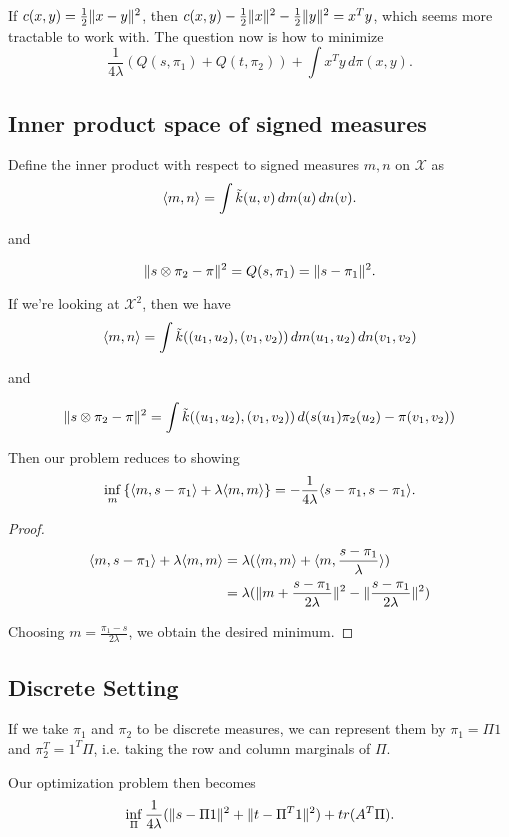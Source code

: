 If $c(x,y)=\frac{1}{2}\lVert x-y\rVert^2$, then $c(x,y)-\frac{1}{2}\lVert x\rVert^2 - \frac{1}{2}\lVert y\rVert^2 = x^{T}y$, which seems more tractable to work with. The question now is how to minimize 
$$
\frac{1}{4\lambda} (Q(s,\pi_1)+Q(t,\pi_2)) + \int x^{T}y\,d\pi(x,y).
$$

\subsection{Inner product space of signed measures}
Define the inner product with respect to signed measures $m,n$ on $\mathcal{X}$ as $$\langle m,n\rangle = \int \tilde{k}(u,v)\,dm(u)\,dn(v).$$

and

$$\lVert s\otimes \pi_2 - \pi\rVert^2 = Q(s,\pi_1) = \lVert s-\pi_1\rVert^2.$$

If we're looking at $\mathcal{X}^2$, then we have
$$
\langle m,n\rangle = \int \tilde{k}((u_1,u_2),(v_1,v_2))\,dm(u_1,u_2)\,dn(v_1,v_2)
$$

and

$$\lVert s\otimes \pi_2 - \pi\rVert^2 = \int \tilde{k}((u_1,u_2),(v_1,v_2))\,d(s(u_1)\pi_2(u_2)-\pi(v_1,v_2))$$

Then our problem reduces to showing $$\inf_m \left\lbrace \langle m,s-\pi_1\rangle + \lambda \langle m,m\rangle\right\rbrace  = -\frac{1}{4\lambda} \langle s-\pi_1,s-\pi_1\rangle.$$

\begin{proof}
	\begin{align*}
	\langle m,s-\pi_1\rangle + \lambda\langle m,m\rangle &= \lambda(\langle m,m\rangle+\langle m,\frac{s-\pi_1}{\lambda}\rangle) \\
	&= \lambda (\lVert m + \frac{s-\pi_1}{2\lambda}\rVert^2 - \lVert\frac{s-\pi_1}{2\lambda}\rVert^2)
	\end{align*}
	
	Choosing $m = \frac{\pi_1 - s}{2\lambda}$, we obtain the desired minimum.
\end{proof}

\subsection{Discrete Setting}

If we take $\pi_1$ and $\pi_2$ to be discrete measures, we can represent them by $\pi_1 = \Pi 1$ and $\pi_2^T=1^{T}\Pi$, i.e. taking the row and column marginals of $\Pi$.

Our optimization problem then becomes $$\inf_{\Pi} \frac{1}{4\lambda} (\lVert s-\Pi 1\rVert^2+\lVert t-\Pi^{T} 1\rVert^2) + tr(A^{T}\Pi).$$

